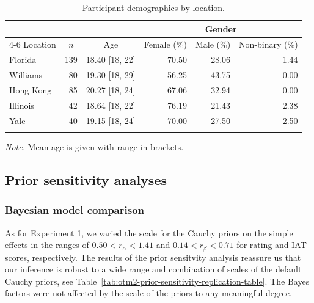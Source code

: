 \documentclass[
  doc]{apa6}
\begin{document}
\begin{table}[h]

\begin{center}
\begin{threeparttable}

\caption{\label{tab:otm2-participant-table}Participant demographics by location.}

\begin{tabular}{lrrrrr}
\toprule
 &  &  & \multicolumn{3}{c}{Gender} \\
\cmidrule(r){4-6}
Location & \multicolumn{1}{c}{$n$} & \multicolumn{1}{c}{Age} & \multicolumn{1}{c}{Female (\%)} & \multicolumn{1}{c}{Male (\%)} & \multicolumn{1}{c}{Non-binary (\%)}\\
\midrule
Florida & 139 & 18.40 [18, 22] & 70.50 & 28.06 & 1.44\\
Williams & 80 & 19.30 [18, 29] & 56.25 & 43.75 & 0.00\\
Hong Kong & 85 & 20.27 [18, 24] & 67.06 & 32.94 & 0.00\\
Illinois & 42 & 18.64 [18, 22] & 76.19 & 21.43 & 2.38\\
Yale & 40 & 19.15 [18, 24] & 70.00 & 27.50 & 2.50\\
\bottomrule
\addlinespace
\end{tabular}

\begin{tablenotes}[para]
\normalsize{\textit{Note.} Mean age is given with range in brackets.}
\end{tablenotes}

\end{threeparttable}
\end{center}

\end{table}

\hypertarget{prior-sensitivity-analyses}{%
\subsection{Prior sensitivity analyses}\label{prior-sensitivity-analyses}}

\hypertarget{bayesian-model-comparison-1}{%
\subsubsection{Bayesian model comparison}\label{bayesian-model-comparison-1}}

As for Experiment 1, we varied the scale for the Cauchy priors on the simple effects in the ranges of \(0.50 < r_\alpha < 1.41\) and \(0.14 < r_\beta < 0.71\) for rating and IAT scores, respectively.
The results of the prior sensitvity analysis reassure us that our inference is robust to a wide range and combination of scales of the default Cauchy priors, see Table~\ref{tab:otm2-prior-sensitivity-replication-table}.
The Bayes factors were not affected by the scale of the priors to any meaningful degree.
\end{document}
